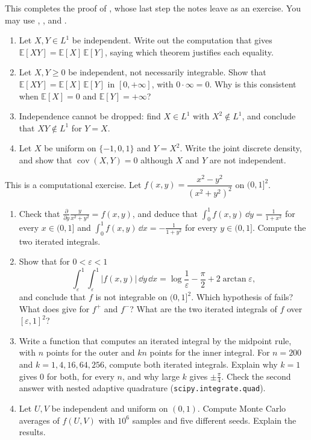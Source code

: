 \begin{exercise}\label{ex:pm-expectation-product}
\easy This completes the proof of , whose last step the
notes leave as an exercise. You may use ,
,  and
.
\begin{enumerate}[label=(\alph*)]
  \item Let $X,Y\in L^1$ be independent. Write out the computation that gives
    $\mathbb E[XY]=\mathbb E[X]\,\mathbb E[Y]$, saying which theorem justifies each equality.
  \item Let $X,Y\ge0$ be independent, not necessarily integrable. Show that
    $\mathbb E[XY]=\mathbb E[X]\,\mathbb E[Y]$ in $[0,+\infty]$, with $0\cdot\infty=0$. Why is
    this consistent when $\mathbb E[X]=0$ and $\mathbb E[Y]=+\infty$?
  \item Independence cannot be dropped: find $X\in L^1$ with $X^2\notin L^1$, and conclude that
    $XY\notin L^1$ for $Y=X$.
  \item Let $X$ be uniform on $\{-1,0,1\}$ and $Y=X^2$. Write the joint discrete density, and
    show that $\operatorname{cov}(X,Y)=0$ although $X$ and $Y$ are not independent.
\end{enumerate}
\end{exercise}

\begin{exercise}\label{ex:pm-fubini-numerics}
\medium This is a computational exercise. Let
$f(x,y)=\dfrac{x^2-y^2}{(x^2+y^2)^2}$ on $(0,1]^2$.
\begin{enumerate}[label=(\alph*)]
  \item Check that $\frac{\partial}{\partial y}\frac{y}{x^2+y^2}=f(x,y)$, and deduce that
    $\int_0^1f(x,y)\,\dd y=\frac1{1+x^2}$ for every $x\in(0,1]$ and $\int_0^1f(x,y)\,\dd x=-\frac1{1+y^2}$
    for every $y\in(0,1]$. Compute the two iterated integrals.
  \item Show that for $0<\varepsilon<1$
    \[
      \int_\varepsilon^1\!\!\int_\varepsilon^1|f(x,y)|\,\dd y\,\dd x=\log\frac1\varepsilon-\frac\pi2+2\arctan\varepsilon,
    \]
    and conclude that $f$ is not integrable on $(0,1]^2$. Which hypothesis of
     fails? What does  give for $f^+$ and $f^-$?
    What are the two iterated integrals of $f$ over $[\varepsilon,1]^2$?
  \item Write a function that computes an iterated integral by the midpoint rule, with $n$
    points for the outer and $kn$ points for the inner integral. For $n=200$ and
    $k=1,4,16,64,256$, compute both iterated integrals. Explain why $k=1$ gives $0$ for both,
    for every $n$, and why large $k$ gives $\pm\frac\pi4$. Check the second answer with nested
    adaptive quadrature (\texttt{scipy.integrate.quad}).
  \item Let $U,V$ be independent and uniform on $(0,1)$. Compute Monte Carlo averages of
    $f(U,V)$ with $10^6$ samples and five different seeds. Explain the results.
\end{enumerate}
\end{exercise}


